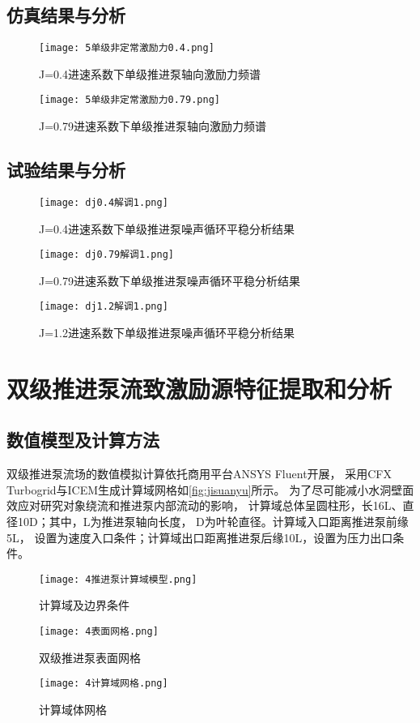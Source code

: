 \subsection{仿真结果与分析}
\begin{figure}[htbp]
    \centering
    \texttt{[image: 5单级非定常激励力0.4.png]}
    \caption{\label{fig:jisuanyuwangge}J=0.4进速系数下单级推进泵轴向激励力频谱}
\end{figure}
\begin{figure}[htbp]
    \centering
    \texttt{[image: 5单级非定常激励力0.79.png]}
    \caption{\label{fig:jisuanyuwangge}J=0.79进速系数下单级推进泵轴向激励力频谱}
\end{figure}
\subsection{试验结果与分析}
\begin{figure}[htbp]
    \centering
    \texttt{[image: dj0.4解调1.png]}
    \caption{\label{fig:jisuanyuwangge}J=0.4进速系数下单级推进泵噪声循环平稳分析结果}
\end{figure}
\begin{figure}[htbp]
    \centering
    \texttt{[image: dj0.79解调1.png]}
    \caption{\label{fig:jisuanyuwangge}J=0.79进速系数下单级推进泵噪声循环平稳分析结果}
\end{figure}
\begin{figure}[htbp]
    \centering
    \texttt{[image: dj1.2解调1.png]}
    \caption{\label{fig:jisuanyuwangge}J=1.2进速系数下单级推进泵噪声循环平稳分析结果}
\end{figure}
\section{双级推进泵流致激励源特征提取和分析}
\subsection{数值模型及计算方法}
双级推进泵流场的数值模拟计算依托商用平台ANSYS Fluent开展，
采用CFX Turbogrid与ICEM生成计算域网格如\autoref{fig:jisuanyu}所示。
为了尽可能减小水洞壁面效应对研究对象绕流和推进泵内部流动的影响，
计算域总体呈圆柱形，长16L、直径10D；其中，L为推进泵轴向长度，
D为叶轮直径。计算域入口距离推进泵前缘5L，
设置为速度入口条件；计算域出口距离推进泵后缘10L，设置为压力出口条件。
\begin{figure}[htbp]
    \centering
    \texttt{[image: 4推进泵计算域模型.png]}
    \caption{\label{fig:jisuanyu}计算域及边界条件}
\end{figure}
\begin{figure}[htbp]
    \centering
    \texttt{[image: 4表面网格.png]}
    \caption{\label{fig:sjwangge}双级推进泵表面网格}
\end{figure}
\begin{figure}[htbp]
    \centering
    \texttt{[image: 4计算域网格.png]}
    \caption{\label{fig:jisuanyuwangge}计算域体网格}
\end{figure}

